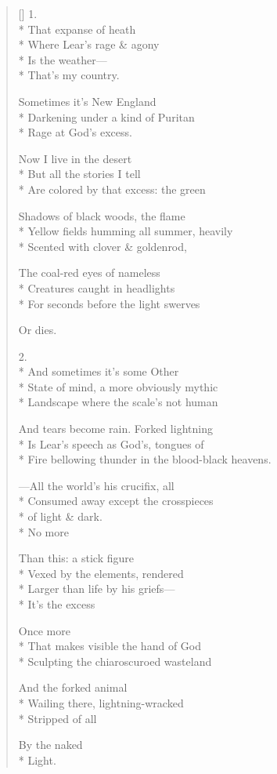 \label{ch:desert_music}
\settowidth{\versewidth}{Fire bellowing thunder in the blood-black heavens.}
\begin{verse}[\versewidth]
1.\\*
That expanse of heath\\*
Where Lear's rage \& agony\\*
Is the weather---\\*
 \qquad  \qquad That's my country.

Sometimes it's New England\\*
Darkening under a kind of Puritan\\*
Rage at God's excess.

Now I live in the desert\\*
But all the stories I tell\\*
Are colored by that excess: the green

Shadows of black woods, the flame\\*
Yellow fields humming all summer, heavily\\*
Scented with clover \& goldenrod,

The coal-red eyes of nameless\\*
Creatures caught in headlights\\*
For seconds before the light swerves

Or dies.

2.\\*
And sometimes it's some Other\\*
State of mind, a more obviously mythic\\*
Landscape where the scale's not human

And tears become rain. Forked lightning\\*
Is Lear's speech as God's, tongues of\\*
Fire bellowing thunder in the blood-black heavens.

---All the world's his crucifix, all\\*
Consumed away except the crosspieces\\*
of light \& dark.\\*
 \qquad  \qquad No more

Than this: a stick figure\\*
Vexed by the elements, rendered \\*
Larger than life by his griefs---\\*
 \qquad  \qquad  \qquad  \qquad It's the excess

Once more\\*
That makes visible the hand of God\\*
Sculpting the chiaroscuroed wasteland

And the forked animal\\*
Wailing there, lightning-wracked\\*
Stripped of all

By the naked\\*
Light.
\end{verse}
